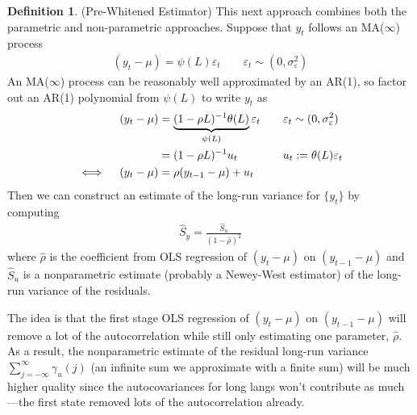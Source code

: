 \documentclass[12pt]{article}
\theoremstyle{plain}
\theoremstyle{definition}
\newtheorem{defn}[thm]{Definition}
\theoremstyle{remark}
\begin{document}
\begin{defn}(Pre-Whitened Estimator)
This next approach combines both the parametric and non-parametric
approaches. Suppose that $y_t$ follows an MA($\infty$) process
\begin{align*}
  (y_t -\mu) = \psi(L)\varepsilon_t
  \qquad \varepsilon_t\sim (0,\sigma^2_\varepsilon)
\end{align*}
An MA($\infty$) process can be reasonably well approximated by an AR(1),
so factor out an AR(1) polynomial from $\psi(L)$ to write $y_t$ as
\begin{align}
  (y_t  - \mu) &=
  \underbrace{(1-\rho L)^{-1} \theta(L)}_{\psi(L)}
  \varepsilon_t
  \qquad
  \varepsilon_t\sim (0,\sigma^2_\varepsilon)
  \notag
  \\
  &=
  (1-\rho L)^{-1} u_t
  \qquad\qquad
  u_t := \theta(L)\varepsilon_t
  \label{prewhiten}
  \\
  \iff\quad
  (y_t -\mu) &= \rho (y_{t-1}-\mu) + u_t
  \notag
\end{align}
Then we can construct an estimate of the long-run variance for $\{y_t\}$
by computing
\begin{align*}
  \hat{S}_y = \frac{\hat{S}_u}{(1-\hat{\rho})^2}
\end{align*}
where $\hat{\rho}$ is the coefficient from OLS regression of
$(y_t-\mu)$ on $(y_{t-1}-\mu)$ and $\hat{S}_u$ is a nonparametric
estimate (probably a Newey-West estimator) of the long-run variance of
the residuals.

The idea is that the first stage OLS regression of $(y_t-\mu)$ on
$(y_{t-1}-\mu)$ will remove a lot of the autocorrelation while still
only estimating one parameter, $\hat{\rho}$. As a result, the
nonparametric estimate of the residual long-run variance
$\sum_{j=-\infty}^\infty\gamma_u(j)$ (an infinite sum we approximate
with a finite sum) will be much higher quality since the autocovariances
for long langs won't contribute as much---the first state removed lots
of the autocorrelation already.
\end{defn}
\end{document}
